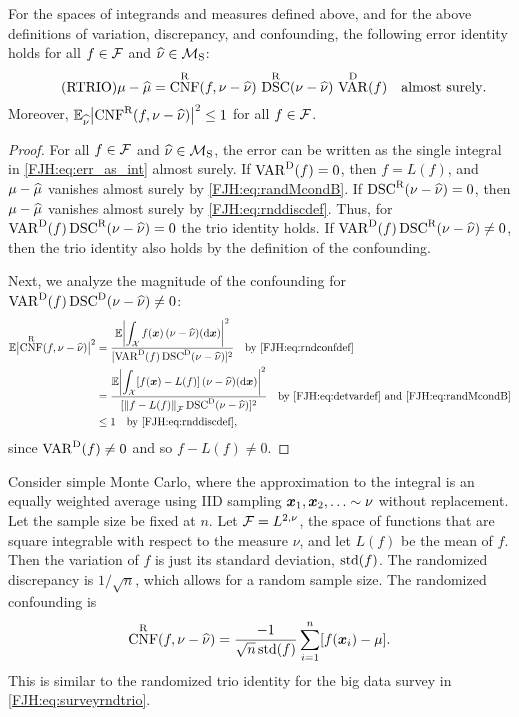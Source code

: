 \documentclass[graybox,footinfo]{svmult}
\DeclareMathOperator{\algn}{CNF}
\DeclareMathOperator{\disc}{DSC}
\DeclareMathOperator{\Var}{VAR}
\begin{document}
\begin{theorem}  \label{FJH:thm:rtrio} For the spaces of 
integrands and 
	measures defined above, and for the above definitions of variation, discrepancy, and 
	confounding, the following error identity holds for all $f \in \mathcal{F}$ and $\widehat{\nu}  \in 
	\mathcal{M}_{\textup{S}}$: 
	\begin{equation} \tag{RTRIO} \label{FJH:eq:rtrio}
	\mu - \hmu  = \algn^\Rn(f,\nu - \hnu) \, \disc^\Rn(\nu - \hnu) \, \Var^{\Dt}(f) \quad 
	\text{almost surely}.
	\end{equation}
	Moreover, $\Ex_{\hnu} \abs{\algn^\Rn(f,\nu - \hnu)}^2  \le 1$ for all $f \in 
	\mathcal{F}$. 
\end{theorem}
\begin{proof}  For all $f \in \mathcal{F}$ and $\widehat{\nu}  \in \mathcal{M}_{\textup{S}}$, the error can be 
written as the single integral in \eqref{FJH:eq:err_as_int} almost surely. 	If $\Var^{\Dt}(f) 
= 0$, then $f = L(f)$, and $\mu - \widehat{\mu}$ vanishes almost surely by
\eqref{FJH:eq:randMcondB}.  If 
$\disc^\Rn(\nu - \hnu) = 0$, then $\mu - \widehat{\mu}$
	vanishes almost surely by \eqref{FJH:eq:rnddiscdef}.  Thus, for $\Var^{\Dt}(f) 
	\disc^\Rn(\nu - \hnu) = 
	0$ 
	the trio identity holds. If $\Var^{\Dt}(f) \disc^\Rn(\nu - \hnu) \ne 0$, then the trio 
	identity also holds by the definition of the confounding.
	
	Next, we analyze the magnitude of the confounding for $\Var^{\Dt}(f) \disc^\Dt(\nu - 
	\hnu) \ne 0$: 
	\begin{align*}
	\bbE \abs{\algn^\Rn(f,\nu - \hnu)}^2 & = 
	\frac{\bbE \biggl \lvert\displaystyle\int_{\cx} f(\bsx) \, (\nu - \hnu)(\D 
		\bsx) \biggr \rvert^2 }{[\Var^\Dt(f)\disc^\Dt(\nu - \hnu)]^2} \quad \text{by 
		\eqref{FJH:eq:rndconfdef}}\\
	& = \frac{\bbE \biggl \lvert\displaystyle\int_{\cx} [f(\bsx) - L(f)] \, (\nu - \hnu)(\D 
		\bsx) \biggr \rvert^2}{[\norm{f-L(f)}_{\cf}\disc^\Dt(\nu - \hnu)]^2} \quad \text{by 
		\eqref{FJH:eq:detvardef} and \eqref{FJH:eq:randMcondB}} \\
	& \le 1 \quad \text{by \eqref{FJH:eq:rnddiscdef}},
	\end{align*}
	since $\Var^{\Dt}(f) \ne 0$ and so $f - L(f) \ne 0$.
\end{proof}

Consider simple Monte Carlo, where the approximation to the integral is an equally 
weighted average using IID sampling ${\boldsymbol{x}}_1, {\boldsymbol{x}}_2, \ldots \sim 
\nu$ without 
replacement. Let the sample size be fixed at $n$.
Let $\mathcal{F} = L^{2,\nu}$, the space of functions that are square integrable with respect to 
the measure $\nu$, and let $L(f)$ be the mean of $f$.  Then the variation of $f$ is just 
its standard 
deviation, $\textup{std}(f)$.  The randomized discrepancy is 
$1/\sqrt{n}$, which allows for a random sample size.  The randomized 
confounding is 
\begin{align*}
\algn^\Rn(f,\nu - \hnu) = \frac{-1}{ \sqrt{n}\, \std(f)}    \sum_{i=1}^n [f(\bsx_i) - 
\mu].
\end{align*}
This is similar to the randomized trio identity for the big data survey in 
\eqref{FJH:eq:surveyrndtrio}.
\end{document}
